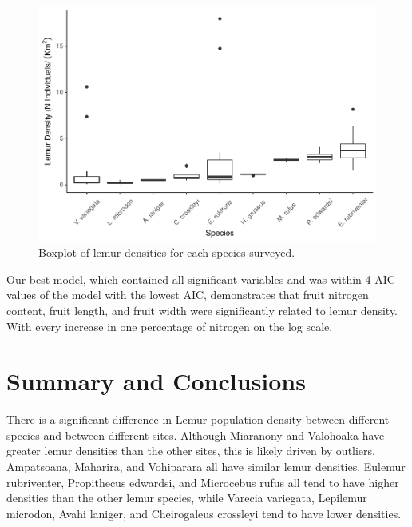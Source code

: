 \documentclass[
  12pt,
]{article}
\begin{document}
\begin{figure}
\centering
\includegraphics{project_draft_files/figure-latex/unnamed-chunk-6-1.pdf}
\caption{Boxplot of lemur densities for each species surveyed.}
\end{figure}

Our best model, which contained all significant variables and was within
4 AIC values of the model with the lowest AIC, demonstrates that fruit
nitrogen content, fruit length, and fruit width were significantly
related to lemur density. With every increase in one percentage of
nitrogen on the log scale,

\newpage

\hypertarget{summary-and-conclusions}{%
\section{Summary and Conclusions}\label{summary-and-conclusions}}

There is a significant difference in Lemur population density between
different species and between different sites. Although Miaranony and
Valohoaka have greater lemur densities than the other sites, this is
likely driven by outliers. Ampatsoana, Maharira, and Vohiparara all have
similar lemur densities. Eulemur rubriventer, Propithecus edwardsi, and
Microcebus rufus all tend to have higher densities than the other lemur
species, while Varecia variegata, Lepilemur microdon, Avahi laniger, and
Cheirogaleus crossleyi tend to have lower densities.
\end{document}
